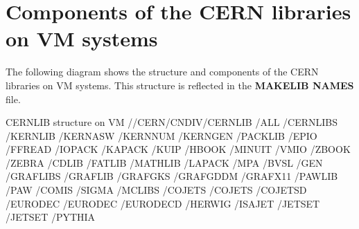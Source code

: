 \section{Components of the CERN libraries on VM systems}

The following diagram shows the structure and components of
the CERN libraries on VM systems. This structure is reflected
in the {\bf MAKELIB NAMES} file.

\begin{XMPt}{CERNLIB structure on VM}
 //CERN/CNDIV/CERNLIB
                     /ALL
                         /CERNLIBS
                                  /KERNLIB
                                          /KERNASW
                                          /KERNNUM
                                          /KERNGEN
                                  /PACKLIB
                                          /EPIO
                                          /FFREAD
                                          /IOPACK
                                          /KAPACK
                                          /KUIP
                                          /HBOOK
                                          /MINUIT
                                          /VMIO
                                          /ZBOOK
                                          /ZEBRA
                                          /CDLIB
                                          /FATLIB
                                  /MATHLIB
                                          /LAPACK
                                          /MPA
                                          /BVSL
                                          /GEN
                                  /GRAFLIBS
                                           /GRAFLIB
                                           /GRAFGKS
                                           /GRAFGDDM
                                           /GRAFX11
                                  /PAWLIB
                                         /PAW
                                         /COMIS
                                         /SIGMA
                         /MCLIBS
                                /COJETS
                                       /COJETS
                                       /COJETSD
                                /EURODEC
                                        /EURODEC
                                        /EURODECD
                                /HERWIG
                                /ISAJET
                                /JETSET
                                       /JETSET
                                       /PYTHIA

\end{XMPt}
